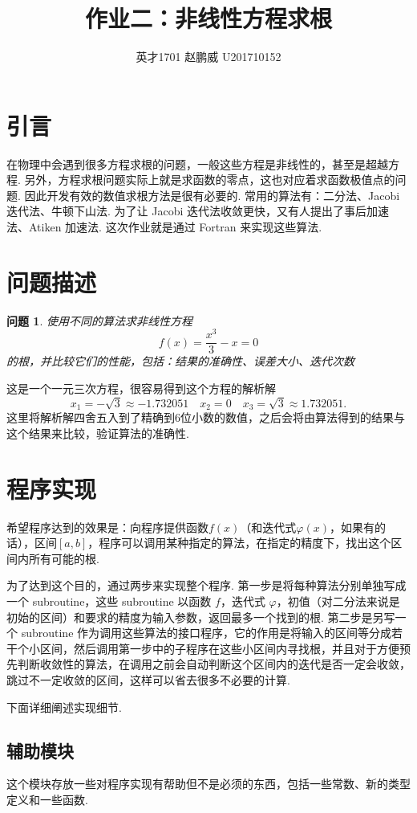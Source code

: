 \documentclass{article}
\title{作业二：非线性方程求根}
\author{英才1701 赵鹏威 U201710152}
\newtheorem{task}{问题}
\begin{document}
	\maketitle
	\tableofcontents
	\newpage
	\section{引言}
	在物理中会遇到很多方程求根的问题，一般这些方程是非线性的，甚至是超越方程. 另外，方程求根问题实际上就是求函数的零点，这也对应着求函数极值点的问题. 因此开发有效的数值求根方法是很有必要的. 常用的算法有：二分法、Jacobi 迭代法、牛顿下山法. 为了让 Jacobi 迭代法收敛更快，又有人提出了事后加速法、Atiken 加速法. 这次作业就是通过 Fortran 来实现这些算法. 
	
	\section{问题描述}
	\begin{task}
		使用不同的算法求非线性方程
		\[
		f(x)=\frac{x^3}{3}-x=0
		\]
		的根，并比较它们的性能，包括：结果的准确性、误差大小、迭代次数
	\end{task}
	
	这是一个一元三次方程，很容易得到这个方程的解析解
	\[
	x_1 = -\sqrt{3}\approx-1.732051 \quad x_2 = 0 \quad x_3=\sqrt{3}\approx1.732051.
	\]
	这里将解析解四舍五入到了精确到6位小数的数值，之后会将由算法得到的结果与这个结果来比较，验证算法的准确性.
	
	\section{程序实现}
	希望程序达到的效果是：向程序提供函数$f(x)$（和迭代式$\varphi(x)$，如果有的话），区间$[a, b]$，程序可以调用某种指定的算法，在指定的精度下，找出这个区间内所有可能的根. 
	
	为了达到这个目的，通过两步来实现整个程序. 第一步是将每种算法分别单独写成一个 subroutine，这些 subroutine 以函数 $f$，迭代式 $\varphi$，初值（对二分法来说是初始的区间）和要求的精度为输入参数，返回最多一个找到的根. 第二步是另写一个 subroutine 作为调用这些算法的接口程序，它的作用是将输入的区间等分成若干个小区间，然后调用第一步中的子程序在这些小区间内寻找根，并且对于方便预先判断收敛性的算法，在调用之前会自动判断这个区间内的迭代是否一定会收敛，跳过不一定收敛的区间，这样可以省去很多不必要的计算.
	
	下面详细阐述实现细节.
	
	\subsection{辅助模块}
	这个模块存放一些对程序实现有帮助但不是必须的东西，包括一些常数、新的类型定义和一些函数.
\end{document}

